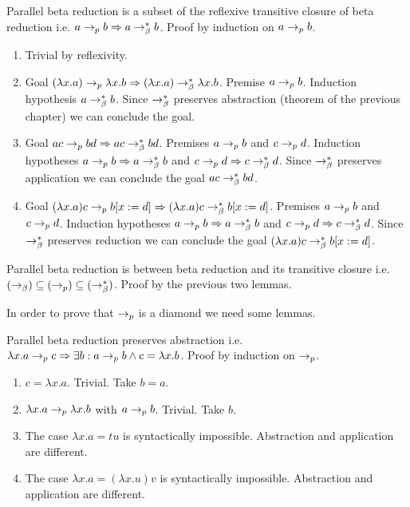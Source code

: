 \documentclass{article}
\begin{document}
\begin{lemma}
  Parallel beta reduction is a subset of the reflexive transitive closure of
  beta reduction i.e.
  $a \to_{p} b \Rightarrow a \to^*_\beta b$.
  Proof by induction on $a \to_{p} b$.
  \begin{enumerate}
  \item
    Trivial by reflexivity.
  \item
    Goal $
    (\lambda x.a) \to_{p} \lambda x.b  \Rightarrow
    (\lambda x.a) \to^*_\beta \lambda x.b$.
    Premise $a \to_{p} b$.
    Induction hypothesis $a \to^*_\beta b$.
    Since $\to^*_\beta$ preserves abstraction (theorem of the previous
    chapter) we can conclude the goal.
  \item
    Goal $a c \to_{p} b d \Rightarrow a c \to^*_\beta b d$.
    Premises $a \to_{p} b$ and $c \to_{p} d$.
    Induction hypotheses $a \to_{p} b \Rightarrow a \to^*_\beta b$ and
    $c \to_{p} d \Rightarrow c \to^*_\beta d$.
    Since $\to^*_\beta$ preserves application we can conclude the goal $a c
    \to^*_\beta b d$.
  \item
    Goal $(\lambda x.a) c \to_{p} b[x:=d] \Rightarrow
    (\lambda x.a) c \to^*_\beta b[x:=d]$.
    Premises $a \to_{p} b$ and $c \to_{p} d$.
    Induction hypotheses $a \to_{p} b \Rightarrow a \to^*_\beta b$ and
    $c \to_{p} d \Rightarrow c \to^*_\beta d$.
    Since $\to^*_\beta$ preserves reduction we can conclude the goal $(\lambda x.a) c
    \to^*_\beta b[x:=d]$.
  \end{enumerate}
\end{lemma}



\begin{theorem}
  Parallel beta reduction is between beta reduction and its transitive closure
  i.e. $(\to_\beta) \subseteq (\to_{p}) \subseteq (\to^*_\beta)$.
  Proof by the previous two lemmas.
\end{theorem}




In order to prove that $\to_{p}$ is a diamond we need some lemmas.

\begin{lemma}
  Parallel beta reduction preserves abstraction i.e.
  $\lambda x.a \to_{p} c \Rightarrow \exists b : a \to_{p} b \land c = \lambda
  x.b$. Proof by induction on $\to_{p}$.
  \begin{enumerate}
  \item $c = \lambda x.a$. Trivial. Take $b = a$.
  \item $\lambda x.a \to_{p} \lambda x.b$ with $a \to_{p} b$. Trivial. Take $b$.
  \item The case $\lambda x.a = t u$ is syntactically impossible. Abstraction
    and application are different.
  \item The case $\lambda x.a = (\lambda x.u) v$ is syntactically
    impossible. Abstraction and application are different.
  \end{enumerate}
\end{lemma}
\end{document}
